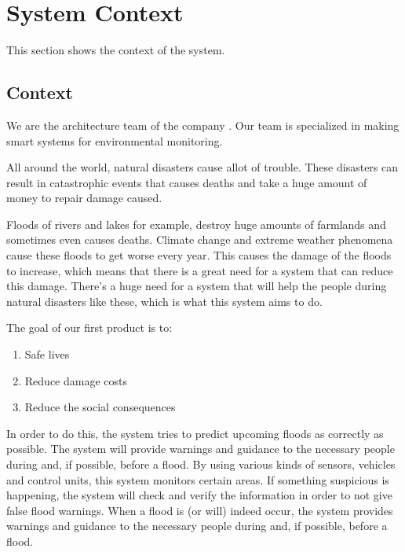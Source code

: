 \chapter{System Context}
\label{ch:context}

This section shows the context of the system.

\section{Context}
We are the architecture team of the company \CompanyName. Our team is specialized in making smart systems for environmental monitoring.

All around the world, natural disasters cause allot of trouble. These disasters can result in catastrophic events that causes deaths and take a huge amount of money to repair damage caused.

Floods of rivers and lakes for example, destroy huge amounts of farmlands and sometimes even causes deaths. Climate change and extreme weather phenomena cause these floods to get worse every year. This causes the damage of the floods to increase, which means that there is a great need for a system that can reduce this damage. There's a huge need for a system that will help the people during natural disasters like these, which is what this system aims to do.


The goal of our first product is to:
\begin{enumerate}
  \item Safe lives
  \item Reduce damage costs
  \item Reduce the social consequences
\end{enumerate}
In order to do this, the system tries to predict upcoming floods as correctly as possible. The system will provide warnings and guidance to the necessary people during and, if possible, before a flood. By using various kinds of sensors, vehicles and control units, this system monitors certain areas. If something suspicious is happening, the system will check and verify the information in order to not give false flood warnings. When a flood is (or will) indeed occur, the system   provides warnings and guidance to the necessary people during and, if possible, before a flood. 

